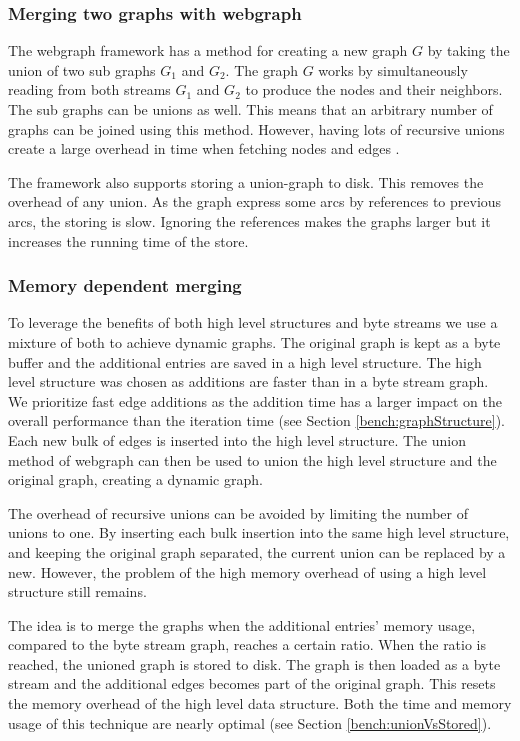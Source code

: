 \subsubsection{Merging two graphs with webgraph}
The webgraph framework has a method for creating a new graph $G$ by taking the union of two sub graphs $G_1$ and $G_2$. The graph $G$ works by simultaneously reading from both streams $G_1$ and $G_2$ to produce the nodes and their neighbors. The sub graphs can be unions as well. This means that an arbitrary number of graphs can be joined using this method. However, having lots of recursive unions create a large overhead in time when fetching nodes and edges \cite{webgraph}. 

The framework also supports storing a union-graph to disk. This removes the overhead of any union. As the graph express some arcs by references to previous arcs, the storing is slow. Ignoring the references makes the graphs larger but it increases the running time of the store.

\subsubsection{Memory dependent merging}
To leverage the benefits of both high level structures and byte streams we use a mixture of both to achieve dynamic graphs. The original graph is kept as a byte buffer and the additional entries are saved in a high level structure. The high level structure was chosen as additions are faster than in a byte stream graph. We prioritize fast edge additions as the addition time has a larger impact on the overall performance than the iteration time (see Section \ref{bench:graphStructure}). Each new bulk of edges is inserted into the high level structure. The union method of webgraph can then be used to union the high level structure and the original graph, creating a dynamic graph.

The overhead of recursive unions can be avoided by limiting the number of unions to one. By inserting each bulk insertion into the same high level structure, and keeping the original graph separated, the current union can be replaced by a new. However, the problem of the high memory overhead of using a high level structure still remains. 

The idea is to merge the graphs when the additional entries' memory usage, compared to the byte stream graph, reaches a certain ratio. When the ratio is reached, the unioned graph is stored to disk. The graph is then loaded as a byte stream and the additional edges becomes part of the original graph. This resets the memory overhead of the high level data structure. Both the time and memory usage of this technique are nearly optimal (see Section \ref{bench:unionVsStored}).

